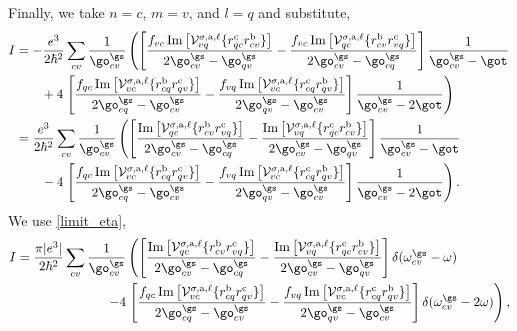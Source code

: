 Finally, we take $n = c$, $m = v$, and $l = q$ and substitute,
\begin{align*}
I &= -\frac{e^3}{2\hbar^2}\sum_{cv}\frac{1}{\go^\gs_{cv}}
  \left(\left[
  \frac{f_{vc}\,\mathrm{Im}\left[\mathcal{V}^{\sigma,\text{a},\ell}_{vq}
        \{r^{\text{c}}_{qc}
        r^{\text{b}}_{cv}\}\right]}
        {2\go^\gs_{cv}-\go^\gs_{qv}}
 -\frac{f_{vc}\,\mathrm{Im}\left[\mathcal{V}^{\sigma,\text{a},\ell}_{qc}
        \{r^{\text{b}}_{cv}
        r^{\text{c}}_{vq}\}\right]}
        {2\go^\gs_{cv}-\go^\gs_{cq}}
\right]\frac{1}{\go^\gs_{cv}-\got}\right.\nonumber\\
&\qquad
+4\left.\left[
  \frac{f_{qc}\,\mathrm{Im}\left[\mathcal{V}^{\sigma,\text{a},\ell}_{vc}
        \{r^{\text{b}}_{cq}
        r^{\text{c}}_{qv}\}\right]}
        {2\go^\gs_{cq}-\go^\gs_{cv}}
 -\frac{f_{vq}\,\mathrm{Im}\left[\mathcal{V}^{\sigma,\text{a},\ell}_{vc}
        \{r^{\text{c}}_{cq}
        r^{\text{b}}_{qv}\}\right]}
        {2\go^\gs_{qv}-\go^\gs_{cv}}
\right]\frac{1}{\go^\gs_{cv}-2\got}\right)\nonumber\\
&= \frac{e^3}{2\hbar^2}\sum_{cv}\frac{1}{\go^\gs_{cv}}
\left(\left[
 \frac{\mathrm{Im}\left[\mathcal{V}^{\sigma,\text{a},\ell}_{qc}
        \{r^{\text{b}}_{cv}
        r^{\text{c}}_{vq}\}\right]}
        {2\go^\gs_{cv}-\go^\gs_{cq}}
 -\frac{\mathrm{Im}\left[\mathcal{V}^{\sigma,\text{a},\ell}_{vq}
        \{r^{\text{c}}_{qc}
        r^{\text{b}}_{cv}\}\right]}
        {2\go^\gs_{cv}-\go^\gs_{qv}}
\right]\frac{1}{\go^\gs_{cv}-\got}\right.\nonumber\\
&\qquad-4
\left.\left[
  \frac{f_{qc}\,\mathrm{Im}\left[\mathcal{V}^{\sigma,\text{a},\ell}_{vc}
        \{r^{\text{b}}_{cq}
        r^{\text{c}}_{qv}\}\right]}
        {2\go^\gs_{cq}-\go^\gs_{cv}}
 -\frac{f_{vq}\,\mathrm{Im}\left[\mathcal{V}^{\sigma,\text{a},\ell}_{vc}
        \{r^{\text{c}}_{cq}
        r^{\text{b}}_{qv}\}\right]}
        {2\go^\gs_{qv}-\go^\gs_{cv}}
\right]\frac{1}{\go^\gs_{cv}-2\got}\right)
.
\end{align*}
We use \eqref{limit_eta},
\begin{align*}
I = \frac{\pi|e^3|}{2\hbar^2}\sum_{cv}\frac{1}{\go^\gs_{cv}}
&\left(\left[
 \frac{\mathrm{Im}\left[\mathcal{V}^{\sigma,\text{a},\ell}_{qc}
        \{r^{\text{b}}_{cv}
        r^{\text{c}}_{vq}\}\right]}
        {2\go^\gs_{cv}-\go^\gs_{cq}}
 -\frac{\mathrm{Im}\left[\mathcal{V}^{\sigma,\text{a},\ell}_{vq}
        \{r^{\text{c}}_{qc}
        r^{\text{b}}_{cv}\}\right]}
        {2\go^\gs_{cv}-\go^\gs_{qv}}
\right]\delta(\omega^{\gs}_{cv}-\omega)\right.\nonumber\\
-
4&\left.\left[
  \frac{f_{qc}\,\mathrm{Im}\left[\mathcal{V}^{\sigma,\text{a},\ell}_{vc}
        \{r^{\text{b}}_{cq}
        r^{\text{c}}_{qv}\}\right]}
        {2\go^\gs_{cq}-\go^\gs_{cv}}
 -\frac{f_{vq}\,\mathrm{Im}\left[\mathcal{V}^{\sigma,\text{a},\ell}_{vc}
        \{r^{\text{c}}_{cq}
        r^{\text{b}}_{qv}\}\right]}
        {2\go^\gs_{qv}-\go^\gs_{cv}}
\right]\delta(\omega^{\gs}_{cv}-2\omega)\right)
,
\end{align*}
